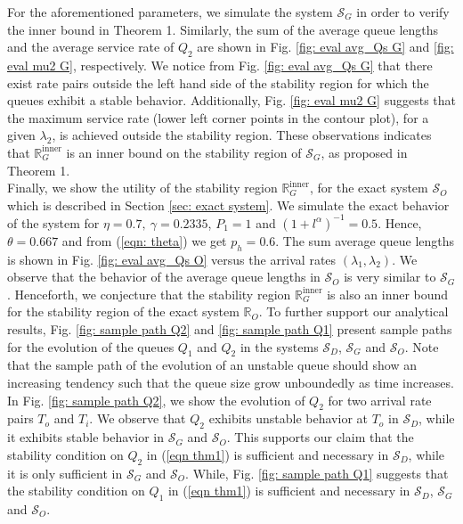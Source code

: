 \documentclass[draftcls,12pt,onecolumn]{IEEEtran}
\begin{document}
\indent For the aforementioned parameters, we simulate the system $ \mathcal{S}_G$ in order to verify the inner bound in Theorem 1. Similarly, the sum of the average queue lengths and the average service rate of $Q_2$ are shown in Fig. \ref{fig: eval avg_Qs G} and \ref{fig: eval mu2 G}, respectively. We notice from Fig. \ref{fig: eval avg_Qs G} that there exist rate pairs outside the left hand side of the stability region for which the queues exhibit a stable behavior. Additionally, Fig. \ref{fig: eval mu2 G} suggests that the maximum service rate (lower left corner points in the contour plot), for a given $\lambda_2$, is achieved outside the stability region. These observations indicates that $\mathbb{R}_G^{\text{inner}}$ is an inner bound on the stability region of $ \mathcal{S}_G$, as proposed in Theorem 1. \\
\indent Finally, we show the utility of the stability region $\mathbb{R}_G^{\text{inner}}$, for the exact system $\mathcal{S}_O$ which is described in Section \ref{sec: exact system}. We simulate the exact behavior of the system for $ \eta\!=\!0.7, \ \gamma\!=\!0.2335$, $P_1\!=\!1 $ and $ (1\!+\!l^\alpha)^{-1}\!=\!0.5$. Hence, $ \theta\!=\!0.667$ and from (\ref{eqn: theta}) we get $ p_h\!=\!0.6 $. The sum average queue lengths is shown in Fig. \ref{fig: eval avg_Qs O} versus the arrival rates $(\lambda_1,\lambda_2)$. We observe that the behavior of the average queue lengths in $ \mathcal{S}_O$ is very similar to $ \mathcal{S}_G$. Henceforth, we conjecture that the stability region $\mathbb{R}_G^{\text{inner}}$ is also an inner bound for the stability region of the exact system $\mathbb{R}_O$. To further support our analytical results, Fig. \ref{fig: sample path Q2} and \ref{fig: sample path Q1} present sample paths for the evolution of the queues $Q_1$ and $Q_2$ in the systems $\mathcal{S}_D$, $\mathcal{S}_G$ and $\mathcal{S}_O$. Note that the sample path of the evolution of an unstable queue should show an increasing tendency such that the queue size grow unboundedly as time increases. In Fig. \ref{fig: sample path Q2}, we show the evolution of $Q_2$ for two arrival rate pairs $T_o $ and $T_i$. We observe that $Q_2$ exhibits unstable behavior at $T_o$ in $\mathcal{S}_D$, while it exhibits stable behavior in $\mathcal{S}_G$ and $\mathcal{S}_O$. This supports our claim that the stability condition on $Q_2$ in (\ref{eqn thm1}) is sufficient and necessary in $\mathcal{S}_D$, while it is only sufficient in $\mathcal{S}_G$ and $\mathcal{S}_O$. While, Fig. \ref{fig: sample path Q1} suggests that the stability condition on $Q_1$ in (\ref{eqn thm1}) is sufficient and necessary in $\mathcal{S}_D$, $\mathcal{S}_G$ and $\mathcal{S}_O$. 
\end{document}
